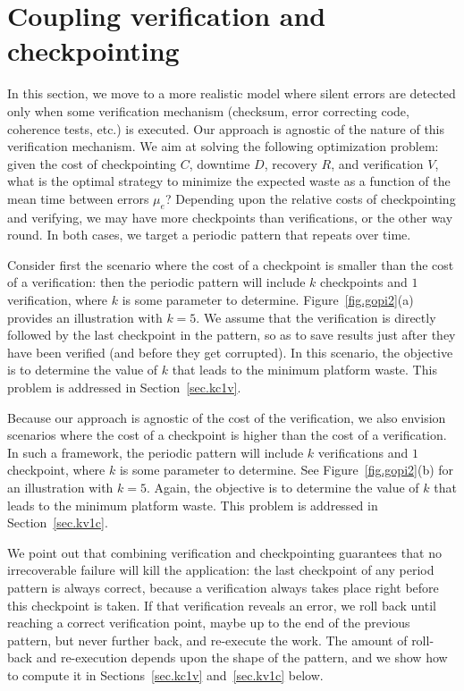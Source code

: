 \documentclass[10pt,table]{article}
\newcommand{\ema}[1]{\ensuremath{#1}\xspace}
\newcommand{\mue}{\ema{\mu_{e}}}
\newcommand{\ccc}{\ema{C}}
\newcommand{\rrr}{\ema{R}}
\newcommand{\ddd}{\ema{D}}
\newcommand{\vvv}{\ema{V}}
\begin{document}
\section{Coupling verification and checkpointing}
\label{sec.ourmodel}

In this section, we move to a more realistic model where silent errors are detected only when some verification mechanism (checksum, error correcting code, coherence tests, etc.) is executed. Our approach is agnostic of the nature of this verification mechanism. We aim at solving the following optimization problem:
given the cost of checkpointing \ccc, downtime \ddd, recovery \rrr, and verification \vvv, what is the optimal 
strategy to minimize the expected waste as a function of the mean time between errors \mue? Depending upon
the relative costs of checkpointing and verifying, we may have more checkpoints than verifications, 
or the other way round. In both cases, we target a periodic pattern that repeats over time. 

Consider first the scenario where the cost of a checkpoint is smaller than the cost of 
a verification: then the periodic pattern will include $k$
checkpoints and $1$ verification, where $k$ is some parameter to determine. 
Figure~\ref{fig.gopi2}(a) provides an illustration with $k=5$. We assume that the 
verification is directly followed by the last checkpoint in the pattern, so as to save results 
just after they have been verified (and before they get corrupted). In this scenario,
the objective is to determine the value of $k$ that leads to the minimum platform waste.
This problem is addressed in Section~\ref{sec.kc1v}.

Because our approach is agnostic of the cost of the verification, we also envision
scenarios where the cost of a checkpoint is higher than the cost of 
a verification. In such a framework, the periodic pattern will include $k$ verifications
and $1$ checkpoint, where $k$ is some parameter to determine. 
See Figure~\ref{fig.gopi2}(b) for an illustration with $k=5$. Again, the 
objective is to determine the value of $k$ that leads to the minimum platform waste.
This problem is addressed in Section~\ref{sec.kv1c}.

We point out that combining verification and checkpointing guarantees that no irrecoverable  failure
will kill the application: the last checkpoint of any period pattern is always correct, because
a verification always takes place right before this checkpoint is taken. If that verification reveals an error, we roll back
until reaching a correct verification point, maybe up to the end of the previous pattern, but never further back,
and re-execute the work.
The amount of roll-back and re-execution depends upon the shape of the pattern,
and we show how to compute it in Sections~\ref{sec.kc1v} and~\ref{sec.kv1c} below.
\end{document}
